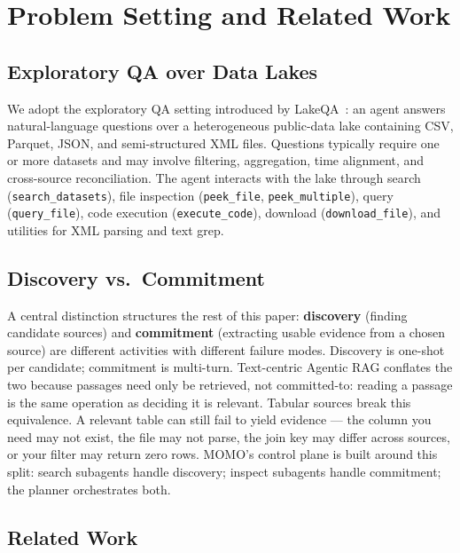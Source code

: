 \section{Problem Setting and Related Work}
\label{sec:problem}

\subsection{Exploratory QA over Data Lakes}

We adopt the exploratory QA setting introduced by LakeQA~\cite{wang2026lakeqa}: an agent answers natural-language questions over a heterogeneous public-data lake containing CSV, Parquet, JSON, and semi-structured XML files. Questions typically require one or more datasets and may involve filtering, aggregation, time alignment, and cross-source reconciliation. The agent interacts with the lake through search (\texttt{search\_datasets}), file inspection (\texttt{peek\_file}, \texttt{peek\_multiple}), query (\texttt{query\_file}), code execution (\texttt{execute\_code}), download (\texttt{download\_file}), and utilities for XML parsing and text grep.

\subsection{Discovery vs.\ Commitment}

A central distinction structures the rest of this paper: \textbf{discovery} (finding candidate sources) and \textbf{commitment} (extracting usable evidence from a chosen source) are different activities with different failure modes. Discovery is one-shot per candidate; commitment is multi-turn. Text-centric Agentic RAG conflates the two because passages need only be retrieved, not committed-to: reading a passage is the same operation as deciding it is relevant. Tabular sources break this equivalence. A relevant table can still fail to yield evidence --- the column you need may not exist, the file may not parse, the join key may differ across sources, or your filter may return zero rows. MOMO's control plane is built around this split: search subagents handle discovery; inspect subagents handle commitment; the planner orchestrates both.

\subsection{Related Work}

